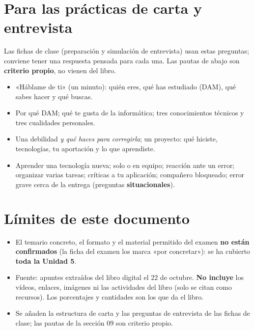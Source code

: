 \section{Para las prácticas de carta y entrevista}
Las fichas de clase (preparación y simulación de entrevista) usan estas preguntas; conviene tener una respuesta pensada para cada una. Las pautas de abajo son \textbf{criterio propio}, no vienen del libro.
\begin{itemize}
\item «Háblame de ti» (un minuto): quién eres, qué has estudiado (DAM), qué sabes hacer y qué buscas.
\item Por qué DAM; qué te gusta de la informática; tres conocimientos técnicos y tres cualidades personales.
\item Una debilidad \emph{y qué haces para corregirla}; un proyecto: qué hiciste, tecnologías, tu aportación y lo que aprendiste.
\item Aprender una tecnología nueva; solo o en equipo; reacción ante un error; organizar varias tareas; críticas a tu aplicación; compañero bloqueado; error grave cerca de la entrega (preguntas \textbf{situacionales}).
\end{itemize}

\section{Límites de este documento}
\begin{itemize}
\item El temario concreto, el formato y el material permitido del examen \textbf{no están confirmados} (la ficha del examen los marca «por concretar»): se ha cubierto \textbf{toda la Unidad 5}.
\item Fuente: apuntes extraídos del libro digital el 22 de octubre. \textbf{No incluye} los vídeos, enlaces, imágenes ni las actividades del libro (solo se citan como recursos). Los porcentajes y cantidades son los que da el libro.
\item Se añaden la estructura de carta y las preguntas de entrevista de las fichas de clase; las pautas de la sección 09 son criterio propio.
\end{itemize}


